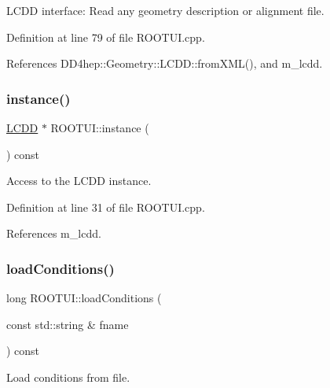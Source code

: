 L\+C\+DD interface\+: Read any geometry description or alignment file. 



Definition at line 79 of file R\+O\+O\+T\+U\+I.\+cpp.



References D\+D4hep\+::\+Geometry\+::\+L\+C\+D\+D\+::from\+X\+M\+L(), and m\+\_\+lcdd.

\hypertarget{class_d_d4hep_1_1_r_o_o_t_u_i_ac60583ecd1fc6819cec76aaacfc3f3c7}{}\label{class_d_d4hep_1_1_r_o_o_t_u_i_ac60583ecd1fc6819cec76aaacfc3f3c7} 
\subsubsection{\texorpdfstring{instance()}{instance()}}
{\footnotesize\ttfamily \hyperlink{class_d_d4hep_1_1_geometry_1_1_l_c_d_d}{L\+C\+DD} $\ast$ R\+O\+O\+T\+U\+I\+::instance (\begin{DoxyParamCaption}{ }\end{DoxyParamCaption}) const}



Access to the L\+C\+DD instance. 



Definition at line 31 of file R\+O\+O\+T\+U\+I.\+cpp.



References m\+\_\+lcdd.

\hypertarget{class_d_d4hep_1_1_r_o_o_t_u_i_a71c5b20a2ce2493401bf543de9e983eb}{}\label{class_d_d4hep_1_1_r_o_o_t_u_i_a71c5b20a2ce2493401bf543de9e983eb} 
\subsubsection{\texorpdfstring{load\+Conditions()}{loadConditions()}}
{\footnotesize\ttfamily long R\+O\+O\+T\+U\+I\+::load\+Conditions (\begin{DoxyParamCaption}\item[{const std\+::string \&}]{fname }\end{DoxyParamCaption}) const}



Load conditions from file. 




